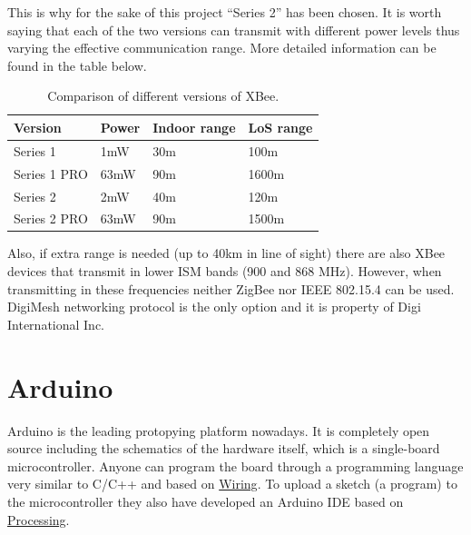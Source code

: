 This is why for the sake of this project ``Series 2'' has been chosen. It is worth saying that each of the two versions can transmit with different power levels thus varying the effective communication range\citep{faludi2010building}. More detailed information can be found in the table below.

\begin{table}[ht] 
\centering
\begin{tabular}{l l l l}
    Version     & Power                 & Indoor range     & LoS range\footnotemark[1]\\
\hline
Series 1        & 1mW                   & 30m              & 100m\\
Series 1 PRO    & 63mW\footnotemark[2]  & 90m              & 1600m\\
Series 2        & 2mW                   & 40m              & 120m\\
Series 2 PRO    & 63mW\footnotemark[2]  & 90m              & 1500m\\
\end{tabular}
\caption{Comparison of different versions of XBee\textregistered.}
\end{table}


Also, if extra range is needed (up to 40km in line of sight) there are also XBee\textregistered{} devices that transmit in lower ISM bands (900 and 868 MHz). However, when transmitting in these frequencies neither ZigBee nor IEEE 802.15.4 can be used. DigiMesh\texttrademark{} networking protocol is the only option and it is property of Digi International Inc.



\section{Arduino}

Arduino is the leading protopying platform nowadays. It is completely open source including the schematics of the hardware itself, which is a single-board microcontroller. Anyone can program the board through a programming language very similar to C/C++ and based on \href{http://wiring.org.co}{Wiring}. To upload a sketch (a program) to the microcontroller they also have developed an Arduino IDE based on \href{htpp://processing.org}{Processing}.

